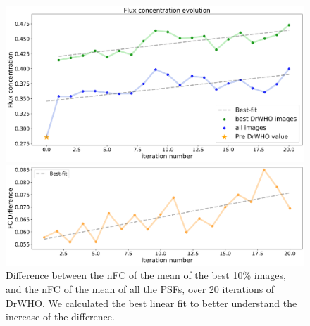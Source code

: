 \documentclass[twocolumn]{aa}
\begin{document}
\begin{figure}[t]
\centering
\includegraphics[width=.5\textwidth]{fig/NNevolution.png}
\caption{Evolution of the FC over 20 iterations of DrWHO, corresponding to a period of 10 minutes, including the nFC of the PSF preceding the run. 
The blue curve corresponds to the evolution of the nFC of all the PSF averaged over the DrWHO iteration, while the green one corresponds to the evolution of the nFC of the 10\% PSF chosen by DrWHO. The best linear fit is presented. }
\label{fig:NNevolion}
\bigbreak
\includegraphics[width=.5\textwidth]{fig/difference.png}
\caption{Difference between the nFC of the mean of the best 10\% images, and the nFC of the mean of all the PSFs, over 20 iterations of DrWHO. We calculated the best linear fit to better understand the increase of the difference.}\label{fig:difference}
\end{figure}



\end{document}
